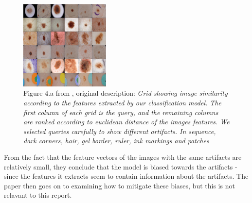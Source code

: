 \begin{figure}[h]
    \centering
    \includegraphics[width=0.4\textwidth]{images/not-so-fast-artifact-query.png}
    \caption[Figure 4.a from \cite{debias-not-so-fast}]{
            Figure 4.a from \cite{debias-not-so-fast}, original description: \textit{Grid showing image similarity according to the features extracted by our classification model. The first column
            of each grid is the query, and the remaining columns are ranked according to euclidean distance of the images features.
            We selected queries carefully to show different artifacts.
            In sequence, dark corners, hair, gel border, ruler, ink markings and patches}}
    \label{fig:not-so-fast-artifact-query}
\end{figure}

From the fact that the feature vectors of the images with the same artifacts are relatively small,
they conclude that the model is biased towards the artifacts - since the features it extracts seem to contain information about the artifacts.
The paper then goes on to examining how to mitigate these biases, but this is not relavant to this report.